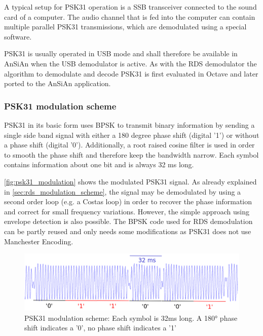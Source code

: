 A typical setup for \ac{PSK31} operation is a \ac{SSB} transceiver connected
to the sound card of a computer. The audio channel that is fed into the computer
can contain multiple parallel \ac{PSK31} transmissions, which are demodulated
using a special software.

PSK31 is usually operated in \ac{USB} mode and shall therefore be available
in \ac{AnSiAn} when the \ac{USB} demodulator is active.
As with the \ac{RDS} demodulator the algorithm to demodulate and decode \ac{PSK31}
is first evaluated in Octave and later ported to the \ac{AnSiAn} application.

\subsubsection{PSK31 modulation scheme}

\ac{PSK31} in its basic form uses \ac{BPSK} to transmit binary information by
sending a single side band signal with either a 180 degree phase shift (digital
'1') or without a phase shift (digital '0'). Additionally, a root raised cosine
filter is used in order to smooth the phase shift and therefore keep the
bandwidth narrow.  Each symbol contains information about one bit and is always
32 ms long.

\autoref{fig:psk31_modulation} shows the modulated \ac{PSK31} signal. As already
explained in \autoref{sec:rds_modulation_scheme}, the signal may be demodulated
by using a second order loop (e.g. a Costas loop) in order to recover the phase
information and correct for small frequency variations. However, the simple approach
using envelope detection is also possible. The \ac{BPSK} code used for \ac{RDS}
demodulation can be partly reused and only needs some modifications as \ac{PSK31}
does not use Manchester Encoding.

\begin{figure}
	\centering
	\includegraphics[width=1\linewidth]{gfx/psk31/psk31_modulation.png}
	\caption{PSK31 modulation scheme: Each symbol is 32ms long. A 180° phase
	shift indicates a '0', no phase shift indicates a '1'}
	\label{fig:psk31_modulation}
\end{figure}

